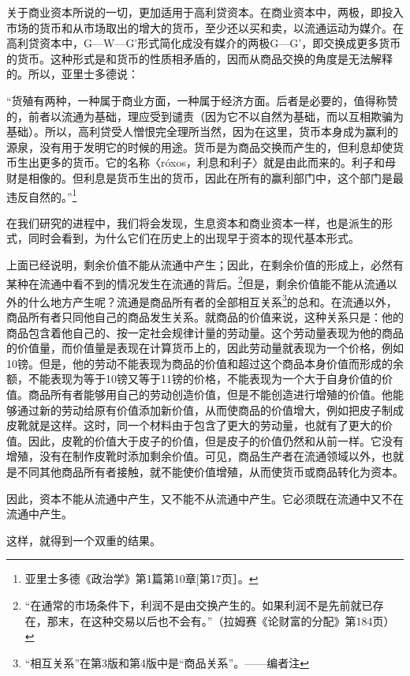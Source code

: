 \documentclass{ctexbook}
\begin{document}
    关于商业资本所说的一切，更加适用于高利贷资本。在商业资本中，两极，即投入市场的货币和从市场取出的增大的货币，至少还以买和卖，以流通运动为媒介。在高利贷资本中，G—W—G'形式简化成没有媒介的两极G—G'，即交换成更多货币的货币。这种形式是和货币的性质相矛盾的，因而从商品交换的角度是无法解释的。所以，亚里士多德说：

    “货殖有两种，一种属于商业方面，一种属于经济方面。后者是必要的，值得称赞的，前者以流通为基础，理应受到谴责（因为它不以自然为基础，而以互相欺骗为基础）。所以，高利贷受人憎恨完全理所当然，因为在这里，货币本身成为赢利的源泉，没有用于发明它的时候的用途。货币是为商品交换而产生的，但利息却使货币生出更多的货币。它的名称〈róxos，利息和利子〉就是由此而来的。利子和母财是相像的。但利息是货币生出的货币，因此在所有的赢利部门中，这个部门是最违反自然的。”\footnote{亚里士多德《政治学》第1篇第10章[第17页］。}

    在我们研究的进程中，我们将会发现，生息资本和商业资本一样，也是派生的形式，同时会看到，为什么它们在历史上的出现早于资本的现代基本形式。

    上面已经说明，剩余价值不能从流通中产生；因此，在剩余价值的形成上，必然有某种在流通中看不到的情况发生在流通的背后。\footnote{“在通常的市场条件下，利润不是由交换产生的。如果利润不是先前就已存在，那末，在这种交易以后也不会有。”（拉姆赛《论财富的分配》第184页）}但是，剩余价值能不能从流通以外的什么地方产生呢？流通是商品所有者的全部相互关系\footnote{“相互关系”在第3版和第4版中是“商品关系”。——编者注}的总和。在流通以外，商品所有者只同他自己的商品发生关系。就商品的价值来说，这种关系只是：他的商品包含着他自己的、按一定社会规律计量的劳动量。这个劳动量表现为他的商品的价值量，而价值量是表现在计算货币上的，因此劳动量就表现为一个价格，例如10镑。但是，他的劳动不能表现为商品的价值和超过这个商品本身价值而形成的余额，不能表现为等于10镑又等于11镑的价格，不能表现为一个大于自身价值的价值。商品所有者能够用自己的劳动创造价值，但是不能创造进行增殖的价值。他能够通过新的劳动给原有价值添加新价值，从而使商品的价值增大，例如把皮子制成皮靴就是这样。这时，同一个材料由于包含了更大的劳动量，也就有了更大的价值。因此，皮靴的价值大于皮子的价值，但是皮子的价值仍然和从前一样。它没有增殖，没有在制作皮靴时添加剩余价值。可见，商品生产者在流通领域以外，也就是不同其他商品所有者接触，就不能使价值增殖，从而使货币或商品转化为资本。

    因此，资本不能从流通中产生，又不能不从流通中产生。它必须既在流通中又不在流通中产生。

    这样，就得到一个双重的结果。
\end{document}
